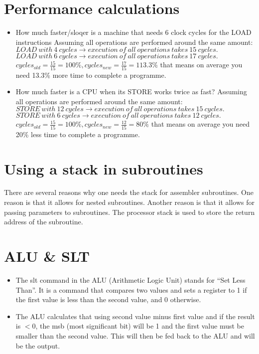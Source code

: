 \documentclass{article}
\begin{document}
\section{Performance calculations}
\begin{itemize}
    \item{How much faster/sloqer is a machine that needs 6 clock cycles for the LOAD instructions}\newline
    Assuming all operations are performed around the same amount:
    \newline
    $ LOAD\ with\ 4\ cycles \rightarrow execution\ of\ all\ operations\ takes\ 15\ cycles. $\newline
    $ LOAD\ with\ 6\ cycles \rightarrow execution\ of\ all\ operations\ takes\ 17\ cycles. $\newline
    $ cycles_{old} = \frac{15}{15}=100\%, cycles_{new} = \frac{17}{15}=113.3\%$ \newline
    that means on average you need 13.3\% more time to complete a programme.

    \item{How much faster is a CPU when its STORE works twice as fast?}\newline
    Assuming all operations are performed around the same amount:
    \newline
    $ STORE\ with\ 12\ cycles \rightarrow execution\ of\ all\ operations\ takes\ 15\ cycles. $\newline
    $ STORE\ with\ 6\ cycles \rightarrow execution\ of\ all\ operations\ takes\ 12\ cycles. $\newline
    $ cycles_{old} = \frac{15}{15}=100\%, cycles_{new} = \frac{12}{15}=80\%$ \newline
    that means on average you need 20\% less time to complete a programme.
\end{itemize}

\section{Using a stack in subroutines}
There are several reasons why one needs the stack for assembler subroutines. 
One reason is that it allows for nested subroutines. Another reason is that 
it allows for passing parameters to subroutines. The processor stack is used 
to store the return address of the subroutine.

\section{ALU & SLT}
\begin{itemize}
    \item The slt command in the ALU (Arithmetic Logic Unit) stands for “Set Less Than”. 
    It is a command that compares two values and sets a register to 1 if the first value 
    is less than the second value, and 0 otherwise.
    \item The ALU calculates that using second
    value minus first value and if the result is $< 0$, the msb (most significant bit) will
    be 1 and the first value must be smaller than the second value. This will then be fed back 
    to the ALU and will be the output.
\end{itemize}
\end{document}
